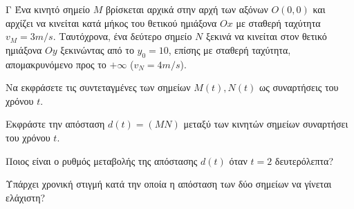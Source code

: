 \begin{thema}{Γ}
Ένα κινητό σημείο $M$ βρίσκεται αρχικά στην αρχή των αξόνων $O(0,0)$ και αρχίζει να κινείται κατά μήκος του θετικού ημιάξονα $Ox$ με σταθερή ταχύτητα $v_M = 3\si{m/s}$. Ταυτόχρονα, ένα δεύτερο σημείο $N$ ξεκινά να κινείται στον θετικό ημιάξονα $Oy$ ξεκινώντας από το $y_0 = 10$, επίσης με σταθερή ταχύτητα, απομακρυνόμενο προς το $+\infty$ ($v_N = 4\si{m/s}$). 
\begin{erwthma}
  \item Να εκφράσετε τις συντεταγμένες των σημείων $M(t), N(t)$ ως συναρτήσεις του χρόνου $t$.
  \item Εκφράστε την απόσταση $d(t) = (MN)$ μεταξύ των κινητών σημείων συναρτήσει του χρόνου $t$.
  \item Ποιος είναι ο ρυθμός μεταβολής της απόστασης $d(t)$ όταν $t = 2$ δευτερόλεπτα?
  \item Υπάρχει χρονική στιγμή κατά την οποία η απόσταση των δύο σημείων να γίνεται ελάχιστη?
\end{erwthma}
\end{thema}
